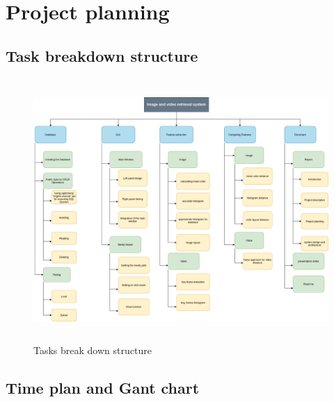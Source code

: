 \chapter{Project planning}


\section{Task breakdown structure}

\begin{figure}[H]
    \centering
    \includegraphics[width=120mm,height=100mm]{Images/TBDS.png}
    \caption{Tasks break down structure}
  \end{figure}




\section{Time plan and Gant chart}

